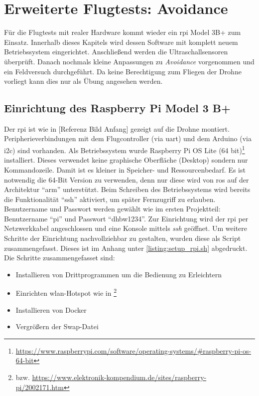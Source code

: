 \chapter{Erweiterte Flugtests: Avoidance}
Für die Flugtests mit realer Hardware kommt wieder ein \gls{rpi} Model 3B+ zum Einsatz. Innerhalb dieses Kapitels wird dessen Software mit komplett neuem Betriebssystem eingerichtet. Anschließend werden die Ultraschallsensoren überprüft. Danach nochmals kleine Anpassungen zu \textit{Avoidance} vorgenommen und ein Feldversuch durchgeführt. Da keine Berechtigung zum Fliegen der Drohne vorliegt kann dies nur als Übung angesehen werden.

\section{Einrichtung des Raspberry Pi Model 3 B+}
Der \gls{rpi} ist wie in [Referenz Bild Anfang] gezeigt auf die Drohne montiert. Peripherieverbindungen mit dem Flugcontroller (via \acrshort{uart}) und dem Arduino (via \acrshort{i2c}) sind vorhanden.\newline
Als Betriebssystem wurde Raspberry Pi OS Lite (64 bit)\footnote{\url{https://www.raspberrypi.com/software/operating-systems/\#raspberry-pi-os-64-bit}} installiert. Dieses verwendet keine graphische Oberfläche (Desktop) sondern nur Kommandozeile. Damit ist es kleiner in Speicher- und Ressourcenbedarf. Es ist notwendig die 64-Bit Version zu verwenden, denn nur diese wird von \acrshort{ros} auf der Architektur \enquote{arm} unterstützt.\newline
Beim Schreiben des Betriebssystems wird bereits die Funktionalität \enquote{ssh} aktiviert, um später Fernzugriff zu erlauben. Benutzername und Passwort werden gewählt wie im ersten Projektteil: Benutzername \enquote{pi} und Passwort \enquote{dhbw1234}. Zur Einrichtung wird der \gls{rpi} per Netzwerkkabel angeschlossen und eine Konsole mittels \textit{ssh} geöffnet.\newline
Um weitere Schritte der Einrichtung nachvollziehbar zu gestalten, wurden diese als Script zusammengefasst. Dieses ist im Anhang unter \ref{listing:setup_rpi.sh} abgedruckt. Die Schritte zusammengefasset sind:
\begin{itemize}
    \item Installieren von Drittprogrammen um die Bedienung zu Erleichtern
    \item Einrichten \gls{wlan}-Hotspot wie in \cite[Kapitel 6.12]{wirthErweiterungBestehendenDrohne2022a}\footnote{bzw. \url{https://www.elektronik-kompendium.de/sites/raspberry-pi/2002171.htm}}
    \item Installieren von Docker
    \item Vergrößern der Swap-Datei
\end{itemize}

